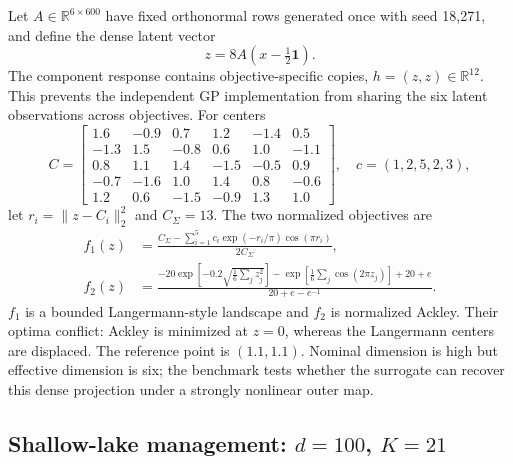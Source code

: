\documentclass{article}
\newcommand{\R}{\mathbb{R}}
\begin{document}
Let $A\in\R^{6\times600}$ have fixed orthonormal rows generated once with seed
18,271, and define the dense latent vector
\begin{equation}
 z=8A(x-\tfrac12\mathbf1).
\end{equation}
The component response contains objective-specific copies,
$h=(z,z)\in\R^{12}$.  This prevents the independent GP implementation from
sharing the six latent observations across objectives.  For centers
\begin{equation}
C=\begin{bmatrix}
1.6&-0.9&0.7&1.2&-1.4&0.5\\
-1.3&1.5&-0.8&0.6&1.0&-1.1\\
0.8&1.1&1.4&-1.5&-0.5&0.9\\
-0.7&-1.6&1.0&1.4&0.8&-0.6\\
1.2&0.6&-1.5&-0.9&1.3&1.0
\end{bmatrix},\quad c=(1,2,5,2,3),
\end{equation}
let $r_i=\lVert z-C_i\rVert_2^2$ and $C_\Sigma=13$.  The two normalized
objectives are
\begin{align}
f_1(z)&=\frac{C_\Sigma-
 \sum_{i=1}^{5}c_i\exp(-r_i/\pi)\cos(\pi r_i)}{2C_\Sigma},
 \label{eq:langermann}\\
f_2(z)&=\frac{-20\exp[-0.2\sqrt{\frac16\sum_j z_j^2}]
 -\exp[\frac16\sum_j\cos(2\pi z_j)]+20+e}{20+e-e^{-1}}.
 \label{eq:ackley}
\end{align}
$f_1$ is a bounded Langermann-style landscape and $f_2$ is normalized Ackley.
Their optima conflict: Ackley is minimized at $z=0$, whereas the Langermann
centers are displaced.  The reference point is $(1.1,1.1)$.  Nominal dimension
is high but effective dimension is six; the benchmark tests whether the
surrogate can recover this dense projection under a strongly nonlinear outer
map.

\subsection{Shallow-lake management: $d=100$, $K=21$}
\end{document}
